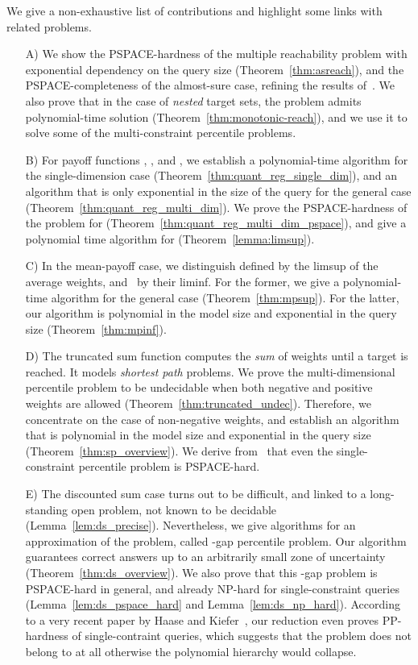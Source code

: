 \documentclass{llncs}
\newcommand\NPTIME{\textrm{\sf NP}}
\newcommand\PSPACE{\textrm{\sf PSPACE}}
\begin{document}
We give a non-exhaustive list of contributions and highlight some links with related problems. 
\begin{itemize}
\item[A)] We show the \PSPACE-hardness of the multiple reachability problem with exponential dependency on the query size (Theorem~\ref{thm:asreach}), and
the \PSPACE-completeness of the almost-sure case, refining the results of~\cite{EKVY-lmcs08}. We also prove that in the case of \emph{nested} target sets, the problem admits polynomial-time solution (Theorem~\ref{thm:monotonic-reach}), and we use it to solve some of the multi-constraint percentile problems.
\item[B)] For payoff functions , ,  and , we establish a polynomial-time algorithm for the single-dimension case (Theorem~\ref{thm:quant_reg_single_dim}), and an algorithm that is only exponential in the size of the query for the general case (Theorem~\ref{thm:quant_reg_multi_dim}).
We prove the \PSPACE-hardness of the problem for  (Theorem~\ref{thm:quant_reg_multi_dim_pspace}), and give a polynomial time algorithm for  
(Theorem~\ref{lemma:limsup}).
\item[C)] In the mean-payoff case, we distinguish  defined by the limsup of the average weights, and~ by their liminf. For the former, we give a polynomial-time algorithm for the general case (Theorem~\ref{thm:mpsup}). For the latter, our algorithm is polynomial in the model size and exponential in the query size (Theorem~\ref{thm:mpinf}).
\item[D)] The truncated sum function computes the \emph{sum} of weights until a target is reached. It models \emph{shortest path} problems. We prove the multi-dimensional percentile problem to be undecidable when both negative and positive weights are allowed (Theorem~\ref{thm:truncated_undec}). Therefore, we concentrate on the case of non-negative weights, and establish an algorithm that is polynomial in the model size and exponential in the query size (Theorem~\ref{thm:sp_overview}). We derive from~\cite{HaaseK14} that even the single-constraint percentile problem is \PSPACE-hard.
\item[E)] The discounted sum case turns out to be difficult, and linked to a long-standing open problem, not known to be decidable (Lemma~\ref{lem:ds_precise}). Nevertheless, we give algorithms for an approximation of the problem, called -gap percentile problem. Our algorithm guarantees correct answers up to an arbitrarily small zone of uncertainty (Theorem~\ref{thm:ds_overview}). We also prove that this -gap problem is \PSPACE-hard in general, and already \NPTIME-hard for single-constraint queries (Lemma~\ref{lem:ds_pspace_hard} and Lemma~\ref{lem:ds_np_hard}). According to a very recent paper by Haase and Kiefer~\cite{HaasePP}, our reduction even proves \textsf{PP}-hardness of single-contraint queries, which suggests that the problem does not belong to  at all otherwise the polynomial hierarchy would collapse.
\end{itemize}
\end{document}
